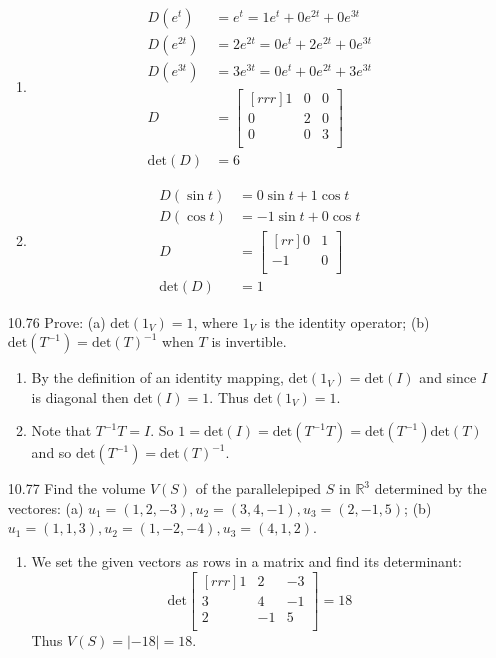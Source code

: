 \documentclass[12pt]{article}
\theoremstyle{definition}
\theoremstyle{plain}
\begin{document}
\begin{enumerate}
\begin{enumerate}
	\item
	\begin{align*}
	D(e^t)&=e^t=1e^t+0e^{2t}+0e^{3t}\\
	D(e^{2t})&=2e^{2t}=0e^t+2e^{2t}+0e^{3t}\\
	D(e^{3t})&=3e^{3t}=0e^t+0e^{2t}+3e^{3t}\\
	D&=\begin{bmatrix}[rrr]1&0&0\\0&2&0\\0&0&3\\\end{bmatrix}\\
	\mathrm{det}(D)&=6
	\end{align*}
	\item
	\begin{align*}
	D(\sin t) &= 0\sin t + 1\cos t\\
	D(\cos t) &= -1\sin t + 0\cos t\\
	D&=\begin{bmatrix}[rr]0&1\\-1&0\\\end{bmatrix}\\
	\mathrm{det}(D)&= 1
	\end{align*}
	\end{enumerate}
	
\item[10.76]Prove: (a) $\mathrm{det}(1_V)=1$, where $1_V$ is the identity operator; (b) $\mathrm{det}(T^{-1})=\mathrm{det}(T)^{-1}$ when $T$ is invertible.
	\begin{enumerate}
	\item By the definition of an identity mapping, $\mathrm{det}(1_V) = \mathrm{det}(I)$ and since $I$ is diagonal then $\mathrm{det}(I)=1$. Thus $\mathrm{det}(1_V)=1$.
	
	\item Note that $T^{-1}T=I$. So $1=\mathrm{det}(I)=\mathrm{det}(T^{-1}T) = \mathrm{det}(T^{-1})\mathrm{det}(T)$ and so $\mathrm{det}(T^{-1}) = \mathrm{det}(T)^{-1}$.
	\end{enumerate}
	
\item[10.77]Find the volume $V(S)$ of the parallelepiped $S$ in $\mathbb{R}^3$ determined by the vectores: (a) $u_1=(1,2,-3),u_2=(3,4,-1),u_3=(2,-1,5)$; (b) $u_1=(1,1,3),u_2=(1,-2,-4),u_3=(4,1,2)$.
	\begin{enumerate}
	\item We set the given vectors as rows in a matrix and find its determinant:
	\[ \mathrm{det}\begin{bmatrix}[rrr]1&2&-3\\3&4&-1\\2&-1&5\\\end{bmatrix} = 18 \]
	Thus $V(S) = |-18| = 18$.
	\end{enumerate}
	

\end{enumerate}
\end{document}
